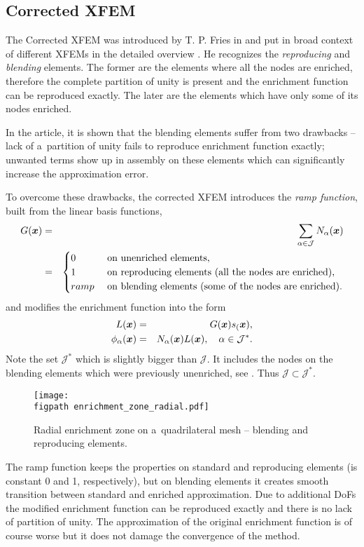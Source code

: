 \subsection{Corrected XFEM} \label{sec:corrected_xfem}
The Corrected XFEM was introduced by T. P. Fries in \cite{fries_corrected_2008} and put in broad context of different XFEMs in the detailed overview \cite{fries_xfem_overview_2010}.
He recognizes the \emph{reproducing} and \emph{blending} elements.
The former are the elements where all the nodes are enriched, therefore the complete partition of unity is present
and the enrichment function can be reproduced exactly. The later are the elements which have only some of its nodes enriched.

In the article, it is shown that the blending elements suffer from two drawbacks -- lack of a~partition of unity fails to reproduce enrichment function exactly;
unwanted terms show up in assembly on these elements which can significantly increase the approximation error.
 
To overcome these drawbacks, the corrected XFEM introduces the \emph{ramp function}, built from the linear basis functions,
\begin{eqnarray} \label{eqn:ramp_function}
  G(\mathbf{\boldsymbol{x}}) &=& \sum_{\alpha\in\mathcal{J}} N_\alpha(\mathbf{\boldsymbol{x}})    \\
  &=& 
  \begin{cases}
    0 & \textrm{ on unenriched elements,}    \\
    1 & \textrm{ on reproducing elements (all the nodes are enriched),}    \\
    ramp & \textrm{ on blending elements (some of the nodes are enriched).}    \\
  \end{cases} \nonumber
\end{eqnarray}
and modifies the enrichment function into the form
\begin{eqnarray} \label{eqn:xfem_ramp}
    L(\mathbf{\boldsymbol{x}}) &=& G(\mathbf{\boldsymbol{x}}) s_(\mathbf{\boldsymbol{x}}),\\
    \phi_{\alpha}(\mathbf{\boldsymbol{x}}) &=& N_\alpha(\mathbf{\boldsymbol{x}})L(\mathbf{\boldsymbol{x}}), \quad \alpha\in\mathcal{J}^*.
\end{eqnarray}
Note the set $\mathcal{J}^*$ which is slightly bigger than $\mathcal{J}$. It includes the nodes on the blending
elements which were previously unenriched, see . Thus $\mathcal{J}\subset\mathcal{J}^*$.
%
\begin{figure}[!htb]
  \centering    
    \texttt{[image: \\figpath enrichment\_zone\_radial.pdf]}
  \caption[Radial enrichment zone.]{Radial enrichment zone on a~quadrilateral mesh -- blending and reproducing elements.}
  \label{fig:enrichment_zone_radial}
\end{figure}
%
The ramp function keeps the properties on standard and reproducing elements (is constant 0 and 1, respectively),
but on blending elements it creates smooth transition between standard and enriched approximation. Due to
additional DoFs the modified enrichment function can be reproduced exactly and there is no lack of partition of unity.
The approximation of the original enrichment function is of course worse but it does not damage the convergence of the method.


